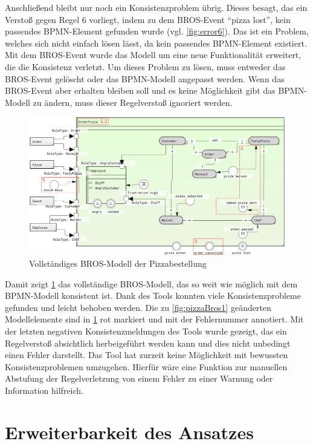 Anschließend bleibt nur noch ein Konsistenzproblem übrig.
Dieses besagt, das ein Verstoß gegen Regel 6 vorliegt, indem zu dem BROS-Event ``pizza lost'', kein passendes BPMN-Element gefunden wurde (vgl. \cref{fig:error6}).
Das ist ein Problem, welches sich nicht einfach lösen lässt, da kein passendes BPMN-Element existiert.
Mit dem BROS-Event wurde das Modell um eine neue Funktionalität erweitert, die die Konsistenz verletzt.
Um dieses Problem zu lösen, muss entweder das BROS-Event gelöscht oder das BPMN-Modell angepasst werden.
Wenn das BROS-Event aber erhalten bleiben soll und es keine Möglichkeit gibt das BPMN-Modell zu ändern, muss dieser Regelverstoß ignoriert werden.

\begin{figure}
    \centering
    \includegraphics[width=\textwidth,keepaspectratio]{../images/example/bros-rule6H.png}%
    \caption{Vollständiges BROS-Modell der Pizzabestellung}%
    \label{fig:pizzaBros6}
\end{figure}

Damit zeigt \cref{fig:pizzaBros6} das vollständige BROS-Modell, das so weit wie möglich mit dem BPMN-Modell konsistent ist.
Dank des Tools konnten viele Konsistenzprobleme gefunden und leicht behoben werden.
Die zu \cref{fig:pizzaBros1} geänderten Modellelemente sind in \cref{fig:pizzaBros6} rot markiert und mit der Fehlernummer annotiert.
Mit der letzten negativen Konsistenzmeldungen des Tools wurde gezeigt, das ein Regelverstoß absichtlich herbeigeführt werden kann und dies nicht unbedingt einen Fehler darstellt.
Das Tool hat zurzeit keine Möglichkeit mit bewussten Konsistenzproblemen umzugehen.
Hierfür wäre eine Funktion zur manuellen Abstufung der Regelverletzung von einem Fehler zu einer Warnung oder Information hilfreich.

\section{Erweiterbarkeit des Ansatzes}

